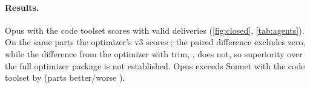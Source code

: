 \begin{table}[t]
\centering
\small
\caption{Study 2 against the optimizer on the same 40 parts (gated IoU, 95\% interval). Valid: delivered programs that build valid / episodes; no-output episodes ended at the deadline with nothing delivered. Differences are paired over parts (better/worse); exploratory.}
\label{tab:agents}
\setlength{\tabcolsep}{4pt}
\end{table}

\paragraph{Results.} Opus with the code toolset scores \cOpusCode{} with \cOpusCodeValid{} valid deliveries (\cref{fig:closed}, \cref{tab:agents}). On the same parts the optimizer's v3 scores \cPipeVThree; the paired difference \cOpusCodeVsVThree{} \cOpusCodeVsVThreeCI{} excludes zero, while the difference from the optimizer with trim, \cOpusCodeVsTrim{} \cOpusCodeVsTrimCI, does not, so superiority over the full optimizer package is not established. Opus exceeds Sonnet with the code toolset by \cOpusVsSonnetCode{} \cOpusVsSonnetCodeCI{} (parts better/worse \cOpusVsSonnetCodeWL).

